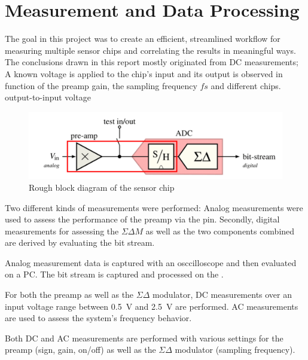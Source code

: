 \chapter{Measurement and Data Processing}
\label{chap:measurementProcess}


The  goal in this project was to create an efficient, streamlined workflow for
measuring  multiple  sensor  chips  and  correlating the results in meaningful
ways.  The  conclusions  drawn  in  this  report  mostly  originated  from  DC
measurements; A known voltage is applied to the chip's input and its output is
observed  in  function  of  the  preamp gain, the sampling frequency $fs$  and
different chips. output-to-input voltage

\begin{figure}[t]
    \centering
    \includegraphics[width=.8\linewidth]{images/blockdiagram.png}
    \caption{Rough block diagram of the sensor chip}
    \label{fig:blockdiagram}
\end{figure}



Two different  kinds  of  measurements were performed: Analog measurements were
used to assess the performance of the  preamp  via  the  pin.
Secondly, digital measurements for assessing the $\Sigma\Delta M$  as  well as
the  two  components  combined  are  derived  by  evaluating the  bit  stream.

Analog measurement data  is captured with an osccilloscope  and then evaluated
on a PC. The bit stream is captured and processed on the \raspi.

For both the  preamp as well as the $\Sigma\Delta$  modulator, DC measurements
over an input  voltage range between \SI{0.5}{\volt}  and  \SI{2.5}{\volt} are
performed. AC measurements are used to assess the system's frequency behavior.

Both DC and AC measurements are performed with various settings for the preamp
(sign,  gain,  on/off)  as  well as  the  $\Sigma\Delta$  modulator  (sampling
frequency).

